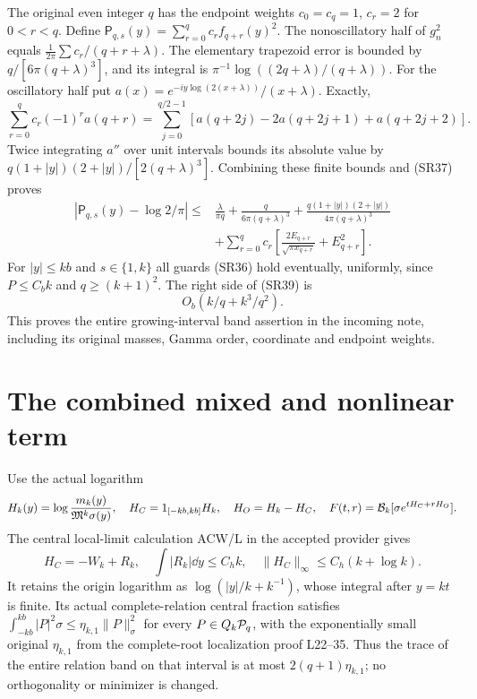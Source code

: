 \documentclass[11pt,a4paper]{article}
\begin{document}
The original even integer $q$ has the endpoint weights
$c_0=c_q=1$, $c_r=2$ for $0<r<q$. Define
$\mathsf P_{q,s}(y)=\sum_{r=0}^qc_rf_{q+r}(y)^2$.
The nonoscillatory half of $g_n^2$ equals
$\frac1{2\pi}\sum c_r/(q+r+\lambda)$.
The elementary trapezoid error is bounded by
$q/[6\pi(q+\lambda)^3]$, and its integral is
$\pi^{-1}\log((2q+\lambda)/(q+\lambda))$.
For the oscillatory half put
$a(x)=e^{-iy\log(2(x+\lambda))}/(x+\lambda)$.
Exactly,
\begin{equation}\tag{SR38}
 \sum_{r=0}^qc_r(-1)^ra(q+r)
 =\sum_{j=0}^{q/2-1}
 [a(q+2j)-2a(q+2j+1)+a(q+2j+2)].
\end{equation}
Twice integrating $a''$ over unit intervals bounds its absolute value by
$q(1+|y|)(2+|y|)/[2(q+\lambda)^3]$.
Combining these finite bounds and (SR37) proves
\begin{equation}\tag{SR39}\begin{aligned}
 |\mathsf P_{q,s}(y)-\log2/\pi|
 \le{}&\frac{\lambda}{\pi q}+
 \frac{q}{6\pi(q+\lambda)^3}
 +\frac{q(1+|y|)(2+|y|)}{4\pi(q+\lambda)^3}\\
 &+\sum_{r=0}^qc_r\left[
 \frac{2E_{q+r}}{\sqrt{\pi x_{q+r}}}+E_{q+r}^2\right].
\end{aligned}\end{equation}
For $|y|\le kb$ and $s\in\{1,k\}$ all guards (SR36) hold eventually,
uniformly, since $P\le C_bk$ and $q\ge(k+1)^2$. The right side of (SR39) is
\begin{equation}\tag{SR40}
 O_b(k/q+k^3/q^2).
\end{equation}
This proves the entire growing-interval band assertion in the incoming note,
including its original masses, Gamma order, coordinate and endpoint weights.

\section{The combined mixed and nonlinear term}
Use the actual logarithm
\[
 H_k(y)=\log\frac{m_k(y)}{\mathfrak M^k\sigma(y)},\quad
 H_C=1_{[-kb,kb]}H_k,\quad H_O=H_k-H_C,
 \quad F(t,r)=\mathcal B_k[\sigma e^{tH_C+rH_O}].
\]
The central local-limit calculation ACW/L in the accepted provider gives
\begin{equation}\tag{SR41}
 H_C=-W_k+R_k,\quad \int|R_k|\dd y\le C_hk,\quad
 \|H_C\|_\infty\le C_h(k+\log k).
\end{equation}
It retains the origin logarithm as $\log(|y|/k+k^{-1})$, whose integral after
$y=kt$ is finite. Its actual complete-relation central fraction satisfies
$\int_{-kb}^{kb}|P|^2\sigma\le\eta_{k,1}\|P\|_\sigma^2$
for every $P\in Q_k\mathcal P_q$, with the exponentially small original
$\eta_{k,1}$ from the complete-root localization proof L22--35.
Thus the trace of the entire relation band on that interval is at most
$2(q+1)\eta_{k,1}$; no orthogonality or minimizer is changed.
\end{document}
